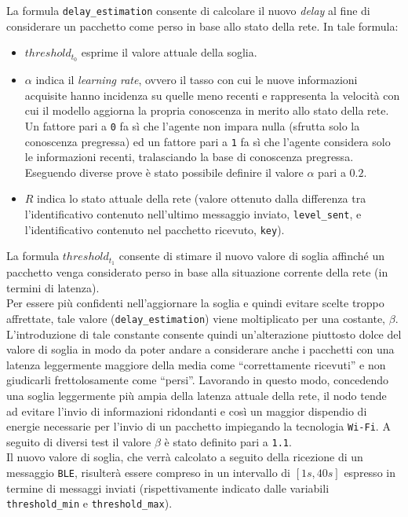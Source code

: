 \noindent La formula \texttt{delay\_estimation} consente di calcolare il nuovo \textit{delay} al fine di considerare un pacchetto come perso in base allo stato della rete. In tale formula: 
\begin{itemize}
    \item $threshold_{t_0}$ esprime il valore attuale della soglia.
    \item $\alpha$ indica il \textit{learning rate}, ovvero il tasso con cui le nuove informazioni acquisite hanno incidenza su quelle meno recenti e rappresenta la velocità con cui il modello aggiorna la propria conoscenza in merito allo stato della rete. Un fattore pari a \texttt{0} fa sì che l'agente non impara nulla (sfrutta solo la conoscenza pregressa) ed un fattore pari a \texttt{1} fa sì che l'agente considera solo le informazioni recenti, tralasciando la base di conoscenza pregressa. Eseguendo diverse prove è stato possibile definire il valore $\alpha$ pari a $0.2$. 
    \item $R$ indica lo stato attuale della rete (valore ottenuto dalla differenza tra l'identificativo contenuto nell'ultimo messaggio inviato, \texttt{level\_sent}, e l'identificativo contenuto nel pacchetto ricevuto, \texttt{key}).
\end{itemize}
\noindent La formula \texttt{$threshold_{t_1}$} consente di stimare il nuovo valore di soglia affinché un pacchetto venga considerato perso in base alla situazione corrente della rete (in termini di latenza).\\
Per essere più confidenti nell'aggiornare la soglia e quindi evitare scelte troppo affrettate, tale valore (\texttt{delay\_estimation}) viene moltiplicato per una costante, \texttt{$\beta$}. L'introduzione di tale constante consente quindi un'alterazione piuttosto dolce del valore di soglia in modo da poter andare a considerare anche i pacchetti con una latenza leggermente maggiore della media come ``correttamente ricevuti'' e non giudicarli frettolosamente come ``persi''. Lavorando in questo modo, concedendo una soglia leggermente più ampia della latenza attuale della rete, il nodo tende ad evitare l'invio di informazioni ridondanti e così un maggior dispendio di energie necessarie per l'invio di un pacchetto impiegando la tecnologia \texttt{Wi-Fi}. A seguito di diversi test il valore $\beta$ è stato definito pari a \texttt{1.1}.\\

\noindent Il nuovo valore di soglia, che verrà calcolato a seguito della ricezione di un messaggio \texttt{BLE}, risulterà essere compreso in un intervallo di $[1s, 40s]$ espresso in termine di messaggi inviati (rispettivamente indicato dalle variabili \texttt{threshold\_min} e \texttt{threshold\_max}).


